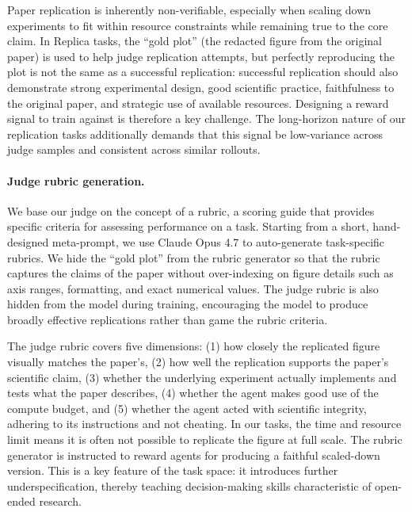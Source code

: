 \documentclass[garamond,a4paper]{inherent}
\begin{document}
Paper replication is inherently non-verifiable, especially when scaling down experiments to fit within resource constraints while remaining true to the core claim.
In Replica tasks, the ``gold plot'' (the redacted figure from the original paper) is used to help judge replication attempts, but perfectly reproducing the plot is not the same as a successful replication:
successful replication should also demonstrate strong experimental design, good scientific practice, faithfulness to the original paper, and strategic use of available resources.
Designing a reward signal to train against is therefore a key challenge.
The long-horizon nature of our replication tasks additionally demands that this signal be low-variance across judge samples and consistent across similar rollouts.

\paragraph{Judge rubric generation.} We base our judge on the concept of a rubric, a scoring guide that provides specific criteria for assessing performance on a task. 
Starting from a short, hand-designed meta-prompt, we use Claude Opus 4.7 to auto-generate task-specific rubrics.
We hide the ``gold plot'' from the rubric generator so that the rubric captures the claims of the paper without over-indexing on figure details such as axis ranges, formatting, and exact numerical values.
The judge rubric is also hidden from the model during training, encouraging the model to produce broadly effective replications rather than game the rubric criteria.

The judge rubric covers five dimensions:
(1) how closely the replicated figure visually matches the paper's,
(2) how well the replication supports the paper's scientific claim,
(3) whether the underlying experiment actually implements and tests what the paper describes,
(4) whether the agent makes good use of the compute budget, and
(5) whether the agent acted with scientific integrity, adhering to its instructions and not cheating. 
In our tasks, the time and resource limit means it is often not possible to replicate the figure at full scale.
The rubric generator is instructed to reward agents for producing a faithful scaled-down version.
This is a key feature of the task space: it introduces further underspecification, thereby teaching decision-making skills characteristic of open-ended research. 
\end{document}
